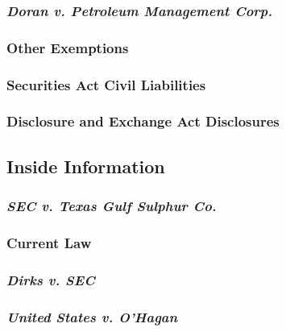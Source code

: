 
\subsubsection{\emph{Doran v. Petroleum Management Corp.}}


\subsubsection{Other Exemptions}


\subsubsection{Securities Act Civil Liabilities}


\subsubsection{Disclosure and Exchange Act Disclosures}


\subsection{Inside Information}

\subsubsection{\emph{SEC v. Texas Gulf Sulphur Co.}}


\subsubsection{Current Law}


\subsubsection{\emph{Dirks v. SEC}}


\subsubsection{\emph{United States v. O'Hagan}}

